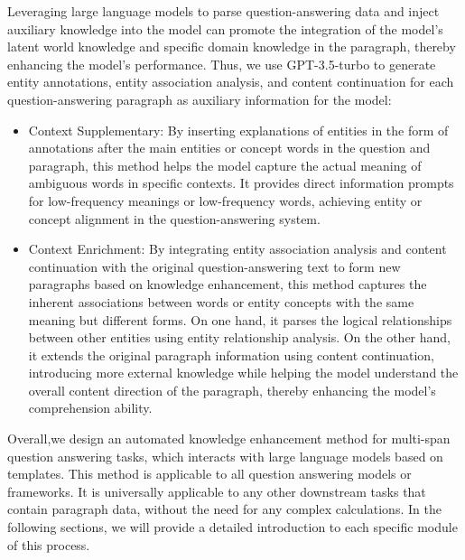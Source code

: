 \documentclass[a4paper,fleqn]{cas-dc}
\newcommand{\1}[1]{\mathds{1}\left[#1\right]}
\begin{document}
	Leveraging large language models to parse question-answering data and inject auxiliary knowledge into the model can promote the integration of the model's latent world knowledge and specific domain knowledge in the paragraph, thereby enhancing the model's performance. Thus, we use GPT-3.5-turbo to generate entity annotations, entity association analysis, and content continuation for each question-answering paragraph as auxiliary information for the model:
	\begin{itemize}
		\item Context Supplementary: By inserting explanations of entities in the form of annotations after the main entities or concept words in the question and paragraph, this method helps the model capture the actual meaning of ambiguous words in specific contexts. It provides direct information prompts for low-frequency meanings or low-frequency words, achieving entity or concept alignment in the question-answering system.
		\item Context Enrichment: By integrating entity association analysis and content continuation with the original question-answering text to form new paragraphs based on knowledge enhancement, this method captures the inherent associations between words or entity concepts with the same meaning but different forms. On one hand, it parses the logical relationships between other entities using entity relationship analysis. On the other hand, it extends the original paragraph information using content continuation, introducing more external knowledge while helping the model understand the overall content direction of the paragraph, thereby enhancing the model's comprehension ability.
	\end{itemize}
	
	Overall,we design an automated knowledge enhancement method for multi-span question answering tasks, which interacts with large language models based on templates. This method is applicable to all question answering models or frameworks. It is universally applicable to any other downstream tasks that contain paragraph data, without the need for any complex calculations. In the following sections, we will provide a detailed introduction to each specific module of this process.
\end{document}

